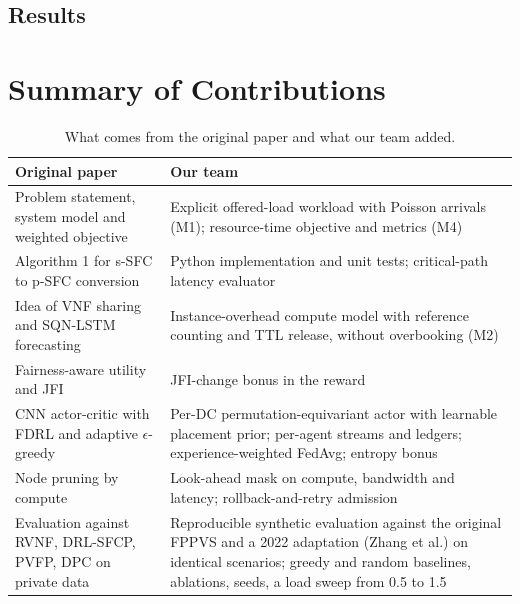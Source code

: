 \documentclass[11pt,a4paper]{article}
\begin{document}
\subsection{Results}



\section*{Summary of Contributions}

\begin{table}[H]
\centering\small
\caption{What comes from the original paper and what our team added.}
\label{tab:contrib}
\begin{tabularx}{\linewidth}{>{\raggedright\arraybackslash}X >{\raggedright\arraybackslash}X}
\toprule
Original paper~\cite{fppvs} & Our team \\
\midrule
Problem statement, system model and weighted objective & Explicit offered-load workload with Poisson arrivals (M1); resource-time objective and metrics (M4) \\
Algorithm 1 for s-SFC to p-SFC conversion & Python implementation and unit tests; critical-path latency evaluator \\
Idea of VNF sharing and SQN-LSTM forecasting & Instance-overhead compute model with reference counting and TTL release, without overbooking (M2) \\
Fairness-aware utility and JFI & JFI-change bonus in the reward \\
CNN actor-critic with FDRL and adaptive $\epsilon$-greedy & Per-DC permutation-equivariant actor with learnable placement prior; per-agent streams and ledgers; experience-weighted FedAvg; entropy bonus \\
Node pruning by compute & Look-ahead mask on compute, bandwidth and latency; rollback-and-retry admission \\
Evaluation against RVNF, DRL-SFCP, PVFP, DPC on private data & Reproducible synthetic evaluation against the original FPPVS and a 2022 adaptation (Zhang et al.) on identical scenarios; greedy and random baselines, ablations, \numSeeds{} seeds, a load sweep from 0.5 to 1.5 \\
\bottomrule
\end{tabularx}
\end{table}

\end{document}
